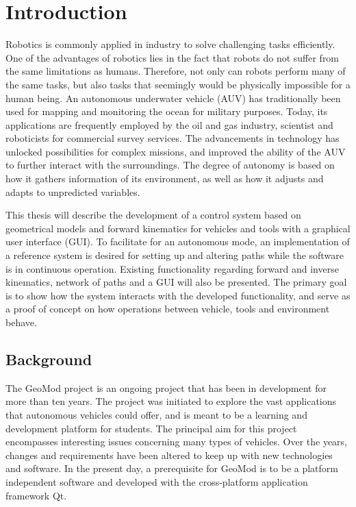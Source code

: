 \chapter{Introduction}

Robotics is commonly applied in industry to solve challenging tasks efficiently. One of the advantages of robotics lies in the fact that robots do not suffer from the same limitations as humans. Therefore, not only can robots perform many of the same tasks, but also tasks that seemingly would be physically impossible for a human being. An autonomous underwater vehicle (AUV) has traditionally been used for mapping and monitoring the ocean for military purposes. Today, its applications are frequently employed by the oil and gas industry, scientist and roboticists for commercial survey services. The advancements in technology has unlocked possibilities for complex missions, and improved the ability of the AUV to further interact with the surroundings. The degree of autonomy is based on how it gathers information of its environment, as well as how it adjusts and adapts to unpredicted variables.

This thesis will describe the development of a control system based on geometrical models and forward kinematics for vehicles and tools with a graphical user interface (GUI). To facilitate for an autonomous mode, an implementation of a reference system is desired for setting up and altering paths while the software is in continuous operation.
Existing functionality regarding forward and inverse kinematics, network of paths and a GUI will also be presented. The primary goal is to show how the system interacts with the developed functionality, and serve as a proof of concept on how operations between vehicle, tools and environment behave.

\section{Background}

The GeoMod project is an ongoing project that has been in development for more than ten years. The project was initiated to explore the vast applications that autonomous vehicles could offer, and is meant to be a learning and development platform for students. The principal aim for this project encompasses interesting issues concerning many types of vehicles. Over the years, changes and requirements have been altered to keep up with new technologies and software. In the present day, a prerequisite for GeoMod is to be a platform independent software and developed with the cross-platform application framework Qt. 

